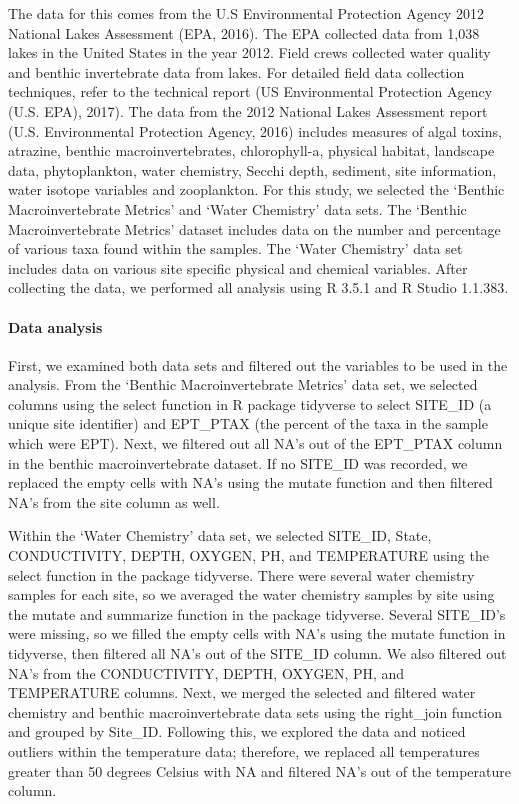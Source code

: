 \documentclass[]{article}
\let\oldparagraph\paragraph
\renewcommand{\paragraph}[1]{\oldparagraph{#1}\mbox{}}
\begin{document}
The data for this comes from the U.S Environmental Protection Agency
2012 National Lakes Assessment (EPA, 2016). The EPA collected data from
1,038 lakes in the United States in the year 2012. Field crews collected
water quality and benthic invertebrate data from lakes. For detailed
field data collection techniques, refer to the technical report (US
Environmental Protection Agency (U.S. EPA), 2017). The data from the
2012 National Lakes Assessment report (U.S. Environmental Protection
Agency, 2016) includes measures of algal toxins, atrazine, benthic
macroinvertebrates, chlorophyll-a, physical habitat, landscape data,
phytoplankton, water chemistry, Secchi depth, sediment, site
information, water isotope variables and zooplankton. For this study, we
selected the `Benthic Macroinvertebrate Metrics' and `Water Chemistry'
data sets. The `Benthic Macroinvertebrate Metrics' dataset includes
data on the number and percentage of various taxa found within the
samples. The `Water Chemistry' data set includes data on various
site specific physical and chemical variables. After collecting the
data, we performed all analysis using R 3.5.1 and R Studio 1.1.383.

\paragraph{Data analysis}\label{data-analysis}

First, we examined both data sets and filtered out the variables to be
used in the analysis. From the `Benthic Macroinvertebrate Metrics'
data set, we selected columns using the select function in R package
tidyverse to select SITE\_ID (a unique site identifier) and EPT\_PTAX
(the percent of the taxa in the sample which were EPT). Next, we
filtered out all NA's out of the EPT\_PTAX column in the benthic
macroinvertebrate dataset. If no SITE\_ID was recorded, we replaced the
empty cells with NA's using the mutate function and then filtered
NA's from the site column as well.

Within the `Water Chemistry' data set, we selected SITE\_ID, State,
CONDUCTIVITY, DEPTH, OXYGEN, PH, and TEMPERATURE using the select
function in the package tidyverse. There were several water chemistry
samples for each site, so we averaged the water chemistry samples by
site using the mutate and summarize function in the package tidyverse.
Several SITE\_ID's were missing, so we filled the empty cells with
NA's using the mutate function in tidyverse, then filtered all NA's
out of the SITE\_ID column. We also filtered out NA's from the
CONDUCTIVITY, DEPTH, OXYGEN, PH, and TEMPERATURE columns. Next, we
merged the selected and filtered water chemistry and benthic
macroinvertebrate data sets using the right\_join function and grouped
by Site\_ID. Following this, we explored the data and noticed outliers
within the temperature data; therefore, we replaced all temperatures
greater than 50 degrees Celsius with NA and filtered NA's out of the
temperature column.
\end{document}
